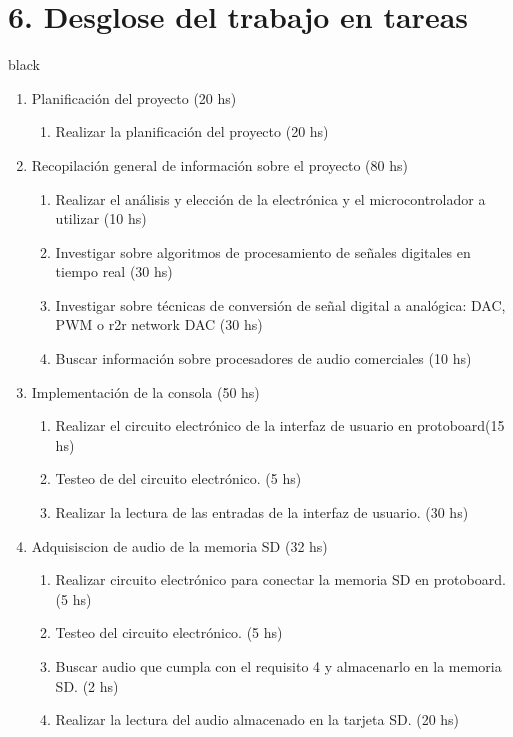 \documentclass[11pt]{charter}
\begin{document}
\section{6. Desglose del trabajo en tareas}
\label{sec:wbs}

\begin{consigna}{black}

\begin{enumerate}
\item Planificación del proyecto (20 hs)
	\begin{enumerate}
	\item Realizar la planificación del proyecto (20 hs)
	\end{enumerate}
\item Recopilación general de información sobre el proyecto (80 hs)
	\begin{enumerate}
	\item Realizar el análisis y elección de la electrónica y el microcontrolador a utilizar (10 hs)
	\item Investigar sobre algoritmos de procesamiento de señales digitales en tiempo real (30 hs)
	\item Investigar sobre técnicas de conversión de señal digital a analógica: DAC, PWM o r2r network DAC (30 hs)
	\item Buscar información sobre procesadores de audio comerciales (10 hs)
	\end{enumerate}
\item Implementación de la consola (50 hs)
	\begin{enumerate}
	\item Realizar el circuito electrónico de la interfaz de usuario en protoboard(15 hs)
	\item Testeo de del circuito electrónico. (5 hs)
	\item Realizar la lectura de las entradas de la interfaz de usuario. (30 hs)
	\end{enumerate}
\item Adquisiscion de audio de la memoria SD (32 hs)
	\begin{enumerate}
	\item Realizar circuito electrónico para conectar la memoria SD en protoboard. (5 hs)
	\item Testeo del circuito electrónico. (5 hs)
	\item Buscar audio que cumpla con el requisito 4 y almacenarlo en la memoria SD. (2 hs)
	\item Realizar la lectura del audio almacenado en la tarjeta SD. (20 hs)

\end{enumerate}
\end{enumerate}
\end{consigna}
\end{document}
